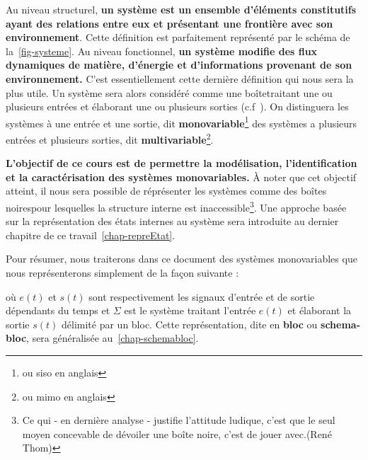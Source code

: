 Au niveau structurel, \textbf{un système est un ensemble 
d'éléments constitutifs ayant des relations entre eux et présentant  
une frontière avec son environnement}. Cette définition est parfaitement
représenté par le schéma de la~\cref{fig-systeme}.
Au niveau fonctionnel, \textbf{un système modifie des flux dynamiques 
de matière, d'énergie et d'informations provenant 
de son environnement.}
C'est essentiellement cette dernière définition qui nous sera la plus utile.
Un système sera alors considéré comme une \og boîte\fg traitant une 
ou plusieurs entrées et élaborant une ou plusieurs sorties 
(c.f~). On distinguera les systèmes à 
une entrée et une sortie, dit \textbf{monovariable}\footnote{ou \gls{siso} 
en anglais} des systèmes  a plusieurs entrées et plusieurs sorties, dit 
\textbf{multivariable}\footnote{ou \gls{mimo} en anglais}.

\textbf{L'objectif de ce cours est de permettre la modélisation, 
l'identification et la caractérisation des systèmes monovariables.} 
\`A noter que cet objectif atteint, il nous sera possible de réprésenter 
les systèmes comme des \og boîtes noires\fg pour lesquelles la structure 
interne est inaccessible\footnote{\og Ce qui - en dernière analyse - justifie 
l'attitude ludique, c'est que le seul moyen concevable de dévoiler une 
boîte noire, c'est de jouer avec.\fg (René Thom)}. Une approche basée 
sur la représentation des états internes au système sera 
introduite au dernier chapitre de ce travail~\cref{chap-repreEtat}. 

Pour résumer, nous traiterons dans ce document 
des systèmes monovariables que nous représenterons simplement 
de la façon suivante :
\begin{center}
    
\end{center}
où $e(t)$ et $s(t)$ sont respectivement les signaux d'entrée et de sortie 
dépendants du temps et $\Sigma$ est le système traitant l'entrée $e(t)$ et 
élaborant la sortie $s(t)$ délimité par un bloc. 
Cette représentation, dite en \textbf{bloc} ou 
\textbf{schema-bloc}, sera généralisée au~\cref{chap-schemabloc}.
\clearpage
\restoregeometry
\captionsetup{width=0.9\linewidth,labelfont=bf}
